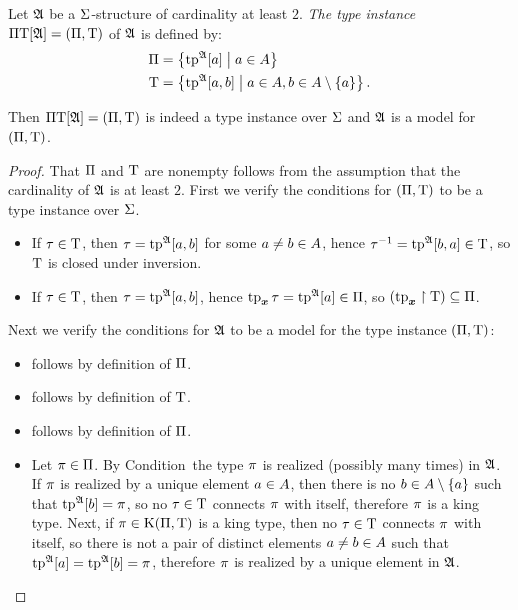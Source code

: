 \begin{definition}
Let $\mathfrak{A}$ be a $\mathrm{\Sigma}$-structure of cardinality at least $2$.
\emph{The type instance} $\Pi\mathrm{T}[\mathfrak{A}] = (\Pi,\mathrm{T})$ of $\mathfrak{A}$ is
defined by:
\begin{align*}
  \Pi &= \left\{\operatorname{tp}^{\mathfrak{A}}[a]\mathrel{}\middle|\mathrel{}a \in A\right\} \\
  \mathrm{T} &= \left\{\operatorname{tp}^{\mathfrak{A}}[a,b]\mathrel{}\middle|\mathrel{}a \in A, b \in A \setminus \left\{a\right\}\right\}.
\end{align*}
\end{definition}
\begin{remark}\label{rem:tpi-str}
Then $\Pi\mathrm{T}[\mathfrak{A}] = (\Pi,\mathrm{T})$ is indeed a type instance over
$\mathrm{\Sigma}$ and $\mathfrak{A}$ is a model for $(\Pi,\mathrm{T})$.
\end{remark}
\begin{proof} 
That $\Pi$ and $\mathrm{T}$ are nonempty follows from the assumption that the
cardinality of $\mathfrak{A}$ is at least $2$.
First we verify the conditions for $(\Pi,\mathrm{T})$ to be a type instance over
$\mathrm{\Sigma}$.
\begin{itemize}
  \item[\refcondtpii]
  If $\tau \in \mathrm{T}$, then $\tau = \operatorname{tp}^{\mathfrak{A}}[a,b]$ for
  some $a \neq b \in A$, hence $\tau^{-1} = \operatorname{tp}^{\mathfrak{A}}[b,a] \in
  \mathrm{T}$, so $\mathrm{T}$ is closed under inversion.
  \item[\refcondtpic]
  If $\tau \in \mathrm{T}$, then $\tau = \operatorname{tp}^{\mathfrak{A}}[a,b]$, hence
  $\operatorname{tp}_{\bm{x}}\tau = \operatorname{tp}^{\mathfrak{A}}[a] \in \Pi$, so $(\operatorname{tp}_{\bm{x}}\restriction\mathrm{T}) \subseteq
  \Pi$.
\end{itemize}
Next we verify the conditions for $\mathfrak{A}$ to be a model for the type instance
$(\Pi,\mathrm{T})$:
\begin{itemize}
  \item[\refcondrealizI] follows by definition of $\Pi$.
  \item[\refcondrealizII] follows by definition of $\mathrm{T}$.
  \item[\refcondrealizp] follows by definition of $\Pi$.
  \item[\refcondrealizk] Let $\pi \in \Pi$.
  By Condition~ the type $\pi$ is realized (possibly many
  times) in $\mathfrak{A}$.
  If $\pi$ is realized by a unique element $a \in A$, then there is
  no $b \in A \setminus \left\{a\right\}$ such that $\operatorname{tp}^{\mathfrak{A}}[b] = \pi$, so no
  $\tau \in \mathrm{T}$ connects $\pi$ with itself, therefore $\pi$ is a king
  type.
  Next, if $\pi \in \mathrm{K}(\Pi,\mathrm{T})$ is a king type, then no $\tau \in \mathrm{T}$
  connects $\pi$ with itself, so there is not a pair of distinct elements
  $a \neq b \in A$ such that $\operatorname{tp}^{\mathfrak{A}}[a] = \operatorname{tp}^{\mathfrak{A}}[b] = \pi$,
  therefore $\pi$ is realized by a unique element in $\mathfrak{A}$.
\end{itemize}
\end{proof}

